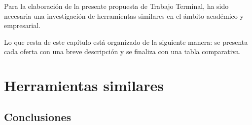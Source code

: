 Para la elaboración de la presente propuesta de Trabajo Terminal, ha sido necesaria una investigación de herramientas similares en el ámbito académico y empresarial.


Lo que resta de este capítulo está organizado de la siguiente manera: se presenta cada oferta con una breve descripción y se finaliza con una tabla comparativa.

\section{Herramientas similares}





\subsection{Conclusiones}



